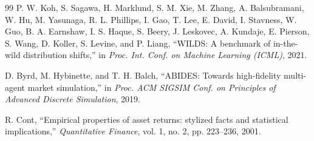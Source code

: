 \documentclass[10pt,twocolumn,letterpaper]{article}
\begin{document}
\begin{thebibliography}{99}
P. W. Koh, S. Sagawa, H. Marklund, S. M. Xie, M. Zhang, A. Balsubramani,
W. Hu, M. Yasunaga, R. L. Phillips, I. Gao, T. Lee, E. David, I. Stavness,
W. Guo, B. A. Earnshaw, I. S. Haque, S. Beery, J. Leskovec, A. Kundaje,
E. Pierson, S. Wang, D. Koller, S. Levine, and P. Liang, ``WILDS: A
benchmark of in-the-wild distribution shifts,'' in \emph{Proc. Int.
Conf. on Machine Learning (ICML)}, 2021.

D. Byrd, M. Hybinette, and T. H. Balch, ``ABIDES: Towards
high-fidelity multi-agent market simulation,'' in \emph{Proc. ACM
SIGSIM Conf. on Principles of Advanced Discrete Simulation}, 2019.

R. Cont, ``Empirical properties of asset returns: stylized facts and
statistical implications,'' \emph{Quantitative Finance}, vol. 1,
no. 2, pp. 223--236, 2001.

\end{thebibliography}
\end{document}

